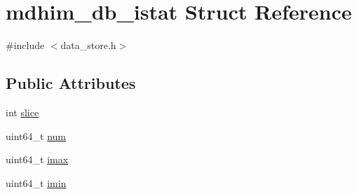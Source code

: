 \hypertarget{structmdhim__db__istat}{\section{mdhim\-\_\-db\-\_\-istat Struct Reference}
\label{d9/d79/structmdhim__db__istat}
}


{\ttfamily \#include $<$data\-\_\-store.\-h$>$}

\subsection*{Public Attributes}
\begin{DoxyCompactItemize}
\item 
int \hyperlink{structmdhim__db__istat_aa478e3ac191e0899e25f312d8aa33b41}{slice}
\item 
uint64\-\_\-t \hyperlink{structmdhim__db__istat_a18e1713a8ca30875d6cd914b11e8a70e}{num}
\item 
uint64\-\_\-t \hyperlink{structmdhim__db__istat_a9e6b79101a083afc00c3ccc47cfc96d6}{imax}
\item 
uint64\-\_\-t \hyperlink{structmdhim__db__istat_a6b2cfaa0eab14f94924d79c8b722aad8}{imin}
\end{DoxyCompactItemize}


